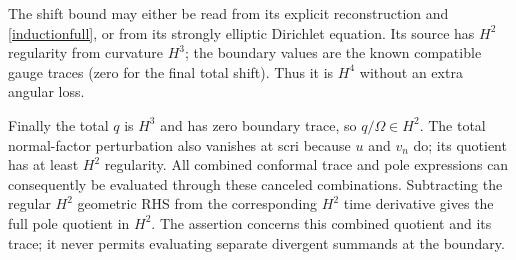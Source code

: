 \documentclass[11pt]{article}
\begin{document}
The shift bound may either be read from its explicit reconstruction and \eqref{inductionfull}, or from its strongly elliptic Dirichlet equation. Its source has $H^2$ regularity from curvature $H^3$; the boundary values are the known compatible gauge traces (zero for the final total shift). Thus it is $H^4$ without an extra angular loss.

Finally the total $q$ is $H^3$ and has zero boundary trace, so $q/\Omega\in H^2$. The total normal-factor perturbation also vanishes at scri because $u$ and $v_n$ do; its quotient has at least $H^2$ regularity. All combined conformal trace and pole expressions can consequently be evaluated through these canceled combinations. Subtracting the regular $H^2$ geometric RHS from the corresponding $H^2$ time derivative gives the full pole quotient in $H^2$. The assertion concerns this combined quotient and its trace; it never permits evaluating separate divergent summands at the boundary.
\end{document}

